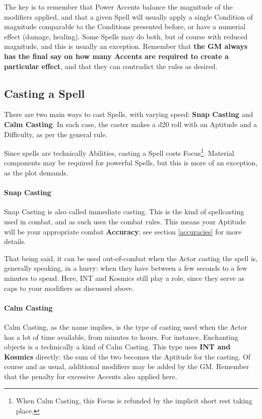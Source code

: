 The key is to remember that Power Accents balance the magnitude of the modifiers applied, and that a given Spell will usually apply a single Condition of magnitude comparable to the Conditions presented before, or have a numerial effect (damage, healing). Some Spells may do both, but of course with reduced magnitude, and this is usually an exception. Remember that \textbf{the GM always has the final say on how many Accents are required to create a particular effect}, and that they can contradict the rules as desired.


\subsection{Casting a Spell}
\label{casting_types}

There are two main ways to cast Spells, with varying speed: \textbf{Snap Casting} and \textbf{Calm Casting}. In each case, the caster makes a d20 roll with an Aptitude and a Difficulty, as per the general rule.

Since spells are technically Abilities, casting a Spell costs Focus\footnote{When Calm Casting, this Focus is refunded by the implicit short rest taking place.}. Material components may be required for powerful Spells, but this is more of an exception, as the plot demands.

\paragraph{Snap Casting}

Snap Casting is also called immediate casting. This is the kind of spellcasting used in combat, and as such uses the combat rules. This means your Aptitude will be your appropriate combat \textbf{Accuracy}: see section \ref{accuracies} for more details. 

That being said, it can be used out-of-combat when the Actor casting the spell is, generally speaking, in a hurry: when they have between a few seconds to a few minutes to spend. Here, INT and Kosmics still play a role, since they serve as caps to your modifiers as discussed above.

\paragraph{Calm Casting}

Calm Casting, as the name implies, is the type of casting used when the Actor has a lot of time available, from minutes to hours. For instance, Enchanting objects is a technically a kind of Calm Casting. This type uses \textbf{INT and Kosmics} directly: the sum of the two becomes the Aptitude for the casting. Of course and as usual, additional modifiers may be added by the GM. Remember that the penalty for excessive Accents also applied here.

